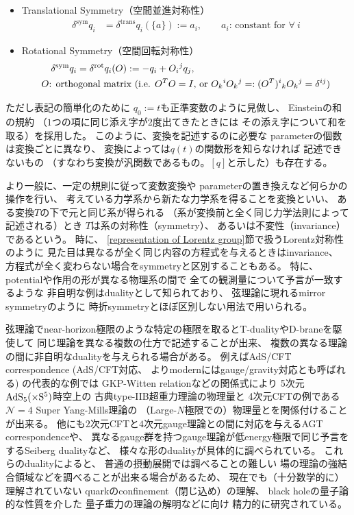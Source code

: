 \begin{itemize}
  \item {Translational Symmetry（空間並進対称性）}
  \begin{align}
    \delta^{\mathrm{sym}} q_i
    &=
    \delta^{\mathrm{trans}}q_i (\{a\} )
    := a_i
    ,\qquad\text{$a_i$: constant for $\forall\ i$}
  \end{align}
  \item {Rotational Symmetry（空間回転対称性）}
  \begin{align}
    &\quad\delta^{\mathrm{sym}} q_i
    =
    \delta^{\mathrm{rot}}q_i ( O )
    := -q_i + O_i{}^j q_j
    ,\\
    &\text{$O$: orthogonal matrix
    (i.e.
      $O^T O = I$, or
      $O_k{}^i O_k{}^j
      =:
      (O^T)^i{}_k O_k{}^j
      =
      \delta^{ij}$)}
  \notag
  \end{align}
\end{itemize}
ただし表記の簡単化のために
$q_0 := t$も正準変数のように見做し、
Einsteinの和の規約
（$1$つの項に同じ添え字が$2$度出てきたときには
その添え字について和を取る）を採用した。
このように、変換を記述するのに必要な
parameterの個数は変換ごとに異なり、
変換によっては$q(t)$の関数形を知らなければ
記述できないもの
（すなわち変換が汎関数であるもの。$[q]$と示した）も存在する。

より一般に、一定の規則に従って変数変換や
parameterの置き換えなど何らかの操作を行い、
考えている力学系から新たな力学系を得ることを変換といい、
ある変換$T$の下で元と同じ系が得られる
（系が変換前と全く同じ力学法則によって記述される）とき
$T$は系の対称性（symmetry）、
あるいは不変性（invariance）であるという。
時に、
\ref{representation of Lorentz group}節で扱うLorentz対称性のように
見た目は異なるが全く同じ内容の方程式を与えるときはinvariance、
方程式が全く変わらない場合をsymmetryと区別することもある。
特に、potentialや作用の形が異なる物理系の間で
全ての観測量について予言が一致するような
非自明な例はdualityとして知られており、
弦理論に現れるmirror symmetryのように
時折symmetryとほぼ区別しない用法で用いられる。

弦理論でnear-horizon極限のような特定の極限を取るとT-dualityやD-braneを駆使して
同じ理論を異なる複数の仕方で記述することが出来、
複数の異なる理論の間に非自明なdualityを与えられる場合がある。
例えばAdS/CFT correspondence
(AdS/CFT対応、
よりmodernにはgauge/gravity対応とも呼ばれる)
の代表的な例では
GKP-Witten relationなどの関係式により
5次元$\rm{AdS}_5(\times S^5)$時空上の
古典type-IIB超重力理論の物理量と
4次元CFTの例である$\mathcal{N}=4$ Super Yang-Mills理論の
（Large-$N$極限での）物理量とを関係付けることが出来る。
他にも$2$次元CFTと$4$次元gauge理論との間に対応を与えるAGT correspondenceや、
異なるgauge群を持つgauge理論が低energy極限で同じ予言をするSeiberg dualityなど、
様々な形のdualityが具体的に調べられている。
これらのdualityによると、
普通の摂動展開では調べることの難しい
場の理論の強結合領域などを調べることが出来る場合があるため、
現在でも（十分数学的に）理解されていない
quarkのconfinement（閉じ込め）の理解、
black holeの量子論的な性質を介した
量子重力の理論の解明などに向け
精力的に研究されている。


